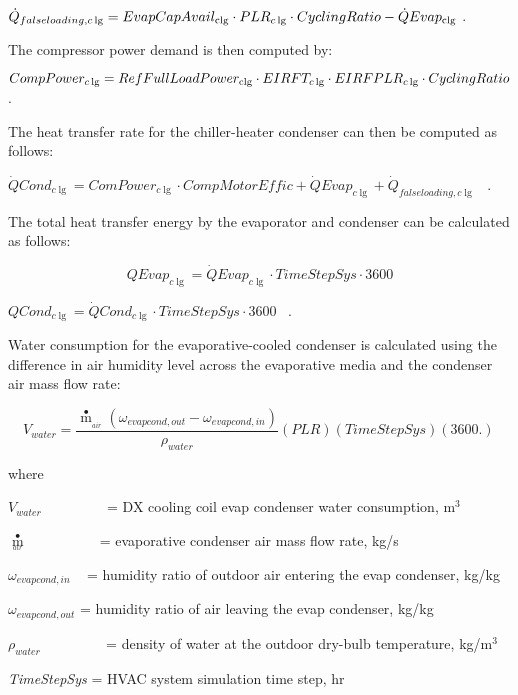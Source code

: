 \({\dot Q_{falseloading,c\lg }} = EvapCapAvai{l_{{\rm{clg}}}} \cdot PL{R_{c\lg }} \cdot CyclingRatio - \dot QEva{p_{{\rm{clg}}}}\) .

The compressor power demand is then computed by:

\(CompPowe{r_{c\lg }} = RefFullLoadPowe{r_{{\rm{clg}}}} \cdot {\rm{ }}EIRF{T_{c\lg }}{\rm{ }} \cdot EIRFPL{R_{c\lg }} \cdot CyclingRatio\) .

The heat transfer rate for the chiller-heater condenser can then be computed as follows:

\(\dot QCon{d_{c\lg }} = ComPowe{r_{c\lg }} \cdot CompMotorEffic + \dot QEva{p_{c\lg }} + {\dot Q_{falseloading,c\lg }}\) ~.

The total heat transfer energy by the evaporator and condenser can be calculated as follows:

\begin{equation}
QEva{p_{c\lg }} = \dot QEva{p_{c\lg }} \cdot TimeStepSys \cdot 3600
\end{equation}

\(QCon{d_{c\lg }} = \dot QCon{d_{c\lg }} \cdot TimeStepSys \cdot 3600\) ~.

Water consumption for the evaporative-cooled condenser is calculated using the difference in air humidity level across the evaporative media and the condenser air mass flow rate:

\begin{equation}
{V_{water}} = \frac{{{{\mathop m\limits^ \bullet  }_{_{air}}}\left( {{\omega_{evapcond,out}} - {\omega_{evapcond,in}}} \right)}}{{{\rho_{water}}}}\left( {PLR} \right)\left( {TimeStepSys} \right)\left( {3600.} \right)\,
\end{equation}

where

\({V_{water}}\) ~~~~~~~~ = DX cooling coil evap condenser water consumption, m\(^{3}\)

\({\mathop m\limits^ \bullet_{_{air}}}\) ~~~~~~~~~ = evaporative condenser air mass flow rate, kg/s

\({\omega_{evapcond,in}}\) ~ = humidity ratio of outdoor air entering the evap condenser, kg/kg

\({\omega_{evapcond,out}}\) = humidity ratio of air leaving the evap condenser, kg/kg

\({\rho_{water}}\) ~~~~~~~~ = density of water at the outdoor dry-bulb temperature, kg/m\(^{3}\)

\emph{TimeStepSys} = HVAC system simulation time step, hr


